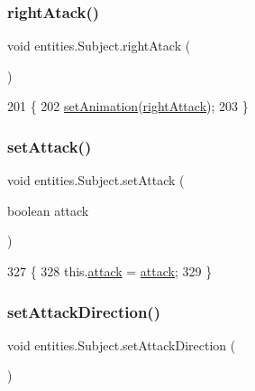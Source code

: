 \subsubsection{\texorpdfstring{right\+Atack()}{rightAtack()}}
{\footnotesize\ttfamily void entities.\+Subject.\+right\+Atack (\begin{DoxyParamCaption}{ }\end{DoxyParamCaption})\hspace{0.3cm}{\ttfamily [inline]}}


\begin{DoxyCode}
201                              \{
202         \mbox{\hyperlink{classentities_1_1_animated_sprite_entity_a089bd746df0d8a9d5687240bb34af2dc}{setAnimation}}(\mbox{\hyperlink{classentities_1_1_subject_aab2192306daae64078eba6d19699bcf0}{rightAttack}});
203     \}
\end{DoxyCode}
\mbox{\label{classentities_1_1_subject_af0888e5d9f89c7afddf8aef0f64ee4e3}} 
\subsubsection{\texorpdfstring{set\+Attack()}{setAttack()}}
{\footnotesize\ttfamily void entities.\+Subject.\+set\+Attack (\begin{DoxyParamCaption}\item[{boolean}]{attack }\end{DoxyParamCaption})\hspace{0.3cm}{\ttfamily [inline]}}


\begin{DoxyCode}
327                                           \{
328         this.\mbox{\hyperlink{classentities_1_1_subject_a97663ba9e9a8708bf9affe4d9bf8de65}{attack}} = \mbox{\hyperlink{classentities_1_1_subject_a97663ba9e9a8708bf9affe4d9bf8de65}{attack}};
329     \}
\end{DoxyCode}
\mbox{\label{classentities_1_1_subject_afca29e70bf8dead65f5b7cceec65a513}} 
\subsubsection{\texorpdfstring{set\+Attack\+Direction()}{setAttackDirection()}}
{\footnotesize\ttfamily void entities.\+Subject.\+set\+Attack\+Direction (\begin{DoxyParamCaption}{ }\end{DoxyParamCaption})\hspace{0.3cm}{\ttfamily [inline]}}


